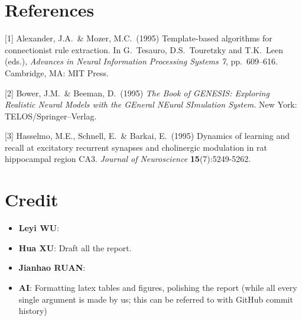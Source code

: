 \documentclass{article}
\begin{document}
\section*{References}
{
\small


[1] Alexander, J.A.\ \& Mozer, M.C.\ (1995) Template-based algorithms for
connectionist rule extraction. In G.\ Tesauro, D.S.\ Touretzky and T.K.\ Leen
(eds.), {\it Advances in Neural Information Processing Systems 7},
pp.\ 609--616. Cambridge, MA: MIT Press.


[2] Bower, J.M.\ \& Beeman, D.\ (1995) {\it The Book of GENESIS: Exploring
  Realistic Neural Models with the GEneral NEural SImulation System.}  New York:
TELOS/Springer--Verlag.


[3] Hasselmo, M.E., Schnell, E.\ \& Barkai, E.\ (1995) Dynamics of learning and
recall at excitatory recurrent synapses and cholinergic modulation in rat
hippocampal region CA3. {\it Journal of Neuroscience} {\bf 15}(7):5249-5262.
}

\section*{Credit}
\begin{itemize}
    \item \textbf{Leyi WU}: 
    \item \textbf{Hua XU}: Draft all the report.
    \item \textbf{Jianhao RUAN}:
    \item \textbf{AI}: Formatting latex tables and figures, polishing the report (while all every single argument is made by us; this can be referred to with GitHub commit history)

\end{itemize}
\end{document}
